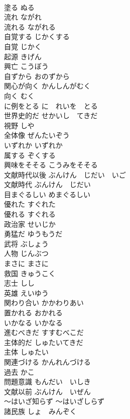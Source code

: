 \documentclass[8pt]{extreport}
\begin{document}
\begin{CJK}{UTF8}{min}
\\	塗る	ぬる	
\\	流れ	ながれ	
\\	流れる	ながれる	
\\	自覚する	じかくする	
\\	自覚	じかく	
\\	起源	きげん	
\\	興亡	こうぼう	
\\	自ずから	おのずから	
\\	関心が向く	かんしんがむく	
\\	向く	むく	
\\	に例をとる	に　れいを　とる	
\\	世界史的だ	せかいし　てきだ	
\\	視野	しや	
\\	全体像	ぜんたいぞう	
\\	いずれか	いずれか	
\\	属する	ぞくする	
\\	興味をそそる	こうみをそそる	
\\	文献時代以後	ぶんけん　じだい　いご	
\\	文献時代	ぶんけん　じだい	
\\	目まぐるしい	めまぐるしい	
\\	優れた	すぐれた	
\\	優れる	すぐれる	
\\	政治家	せいじか	
\\	勇猛だ	ゆうもうだ	
\\	武将	ぶしょう	
\\	人物	じんぶつ	
\\	まさに	まさに	
\\	救国	きゅうこく	
\\	志士	しし	
\\	英雄	えいゆう	
\\	関わり合い	かかわりあい	
\\	置かれる	おかれる	
\\	いかなる	いかなる	
\\	進むべきだ	すすむべこだ	
\\	主体的だ	しゅたいてきだ	
\\	主体	しゅたい	
\\	関連づける	かんれんづける	
\\	過去	かこ	
\\	問題意識	もんだい　いしき	
\\	文献以前	ぶんけん　いぜん	
\\	〜はいざ知らず	〜はいざしらず	
\\	諸民族	しょ　みんぞく	

\end{CJK}
\end{document}
